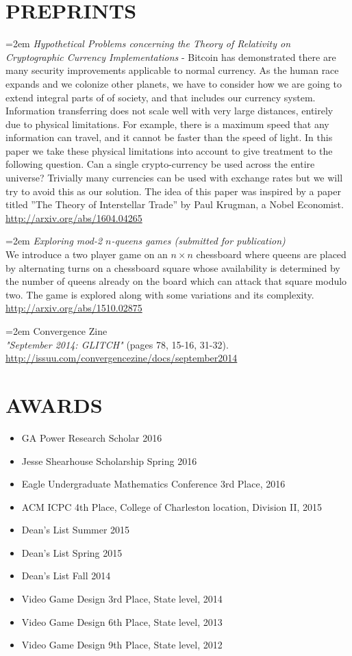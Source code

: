 \documentclass[11pt]{article} %
\begin{document}
\section*{PREPRINTS}
\hangindent=2em
\emph{Hypothetical Problems concerning the Theory of
Relativity on Cryptographic Currency
Implementations} - 
Bitcoin has demonstrated there are many security
improvements applicable to normal currency. As the human race
expands and we colonize other planets, we have to consider how
we are going to extend integral parts of of society, and that
includes our currency system. Information transferring does not
scale well with very large distances, entirely due to physical
limitations. For example, there is a maximum speed that any
information can travel, and it cannot be faster than the speed
of light. In this paper we take these physical limitations into
account to give treatment to the following question. Can a single
crypto-currency be used across the entire universe? Trivially
many currencies can be used with exchange rates but we will
try to avoid this as our solution. The idea of this paper was
inspired by a paper titled ”The Theory of Interstellar Trade” by
Paul Krugman, a Nobel Economist. 
\url{http://arxiv.org/abs/1604.04265}

\hangindent=2em
\emph{Exploring mod-2 $n$-queens games (submitted for publication)}\\
We introduce a two player game on an $n \times n$ chessboard where queens are placed by alternating turns on a chessboard square whose availability is determined by the number of queens already on the board which can attack that square modulo two. The game is explored along with some variations and its complexity.\\
\url{http://arxiv.org/abs/1510.02875}

\hangindent=2em
Convergence Zine\\
\emph{"September 2014: GLITCH"} ​(pages 7­8, 15-­16, 31-­32). \url{http://issuu.com/convergencezine/docs/september2014}
\\
\section*{AWARDS}
\begin{itemize}
  \setlength{\itemsep}{1pt}
  \setlength{\parskip}{0pt}
  \setlength{\parsep}{0pt}
\item GA Power Research Scholar 2016
\item Jesse Shearhouse Scholarship Spring 2016
\item Eagle Undergraduate Mathematics Conference 3rd Place, 2016
\item ACM ICPC 4th Place, College of Charleston location, Division II, 2015
\item Dean's List Summer 2015
\item Dean's List Spring 2015
\item Dean's List Fall 2014
\item Video Game Design 3rd Place, State level, 2014
\item Video Game Design 6th Place, State level, 2013
\item Video Game Design 9th Place, State level, 2012
\end{itemize}
\end{document}
